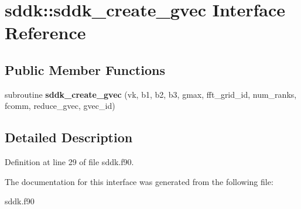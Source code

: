 \hypertarget{interfacesddk_1_1sddk__create__gvec}{}\section{sddk\+:\+:sddk\+\_\+create\+\_\+gvec Interface Reference}
\label{interfacesddk_1_1sddk__create__gvec}
\subsection*{Public Member Functions}
\begin{DoxyCompactItemize}
\item 
\hypertarget{interfacesddk_1_1sddk__create__gvec_a7a198dafa192f9ae16ce2ce359de86c0}{}subroutine {\bfseries sddk\+\_\+create\+\_\+gvec} (vk, b1, b2, b3, gmax, fft\+\_\+grid\+\_\+id, num\+\_\+ranks, fcomm, reduce\+\_\+gvec, gvec\+\_\+id)\label{interfacesddk_1_1sddk__create__gvec_a7a198dafa192f9ae16ce2ce359de86c0}

\end{DoxyCompactItemize}


\subsection{Detailed Description}


Definition at line 29 of file sddk.\+f90.



The documentation for this interface was generated from the following file\+:\begin{DoxyCompactItemize}
\item 
sddk.\+f90\end{DoxyCompactItemize}
